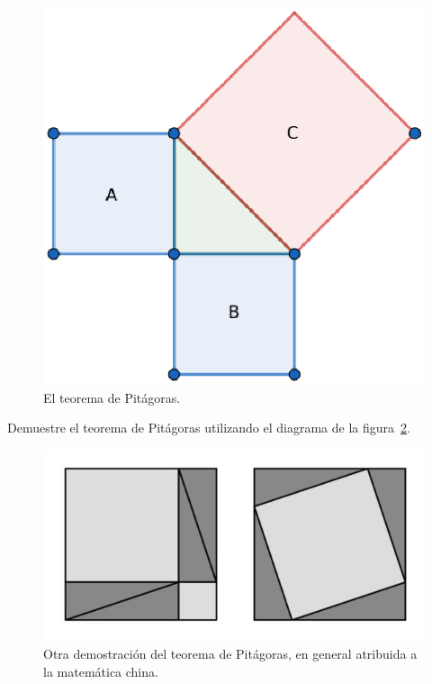 %

\begin{figure}
   \centering
   \includegraphics[scale=0.5]{images/thm_pitagoras}
   \caption{El teorema de Pitágoras.}
   \label{fig:pitagoras}
\end{figure}

\begin{exercise}
	Demuestre el teorema de Pitágoras utilizando el diagrama de la
	figura~\ref{fig:pitagoras1}.
	\begin{figure}[h]
		\centering
		\includegraphics[scale=.4]{images/pitagoras_proof}
		\caption{Otra demostración del teorema de Pitágoras, en general
		atribuida a la matemática china.}
		\label{fig:pitagoras1}
	\end{figure}
\end{exercise}

